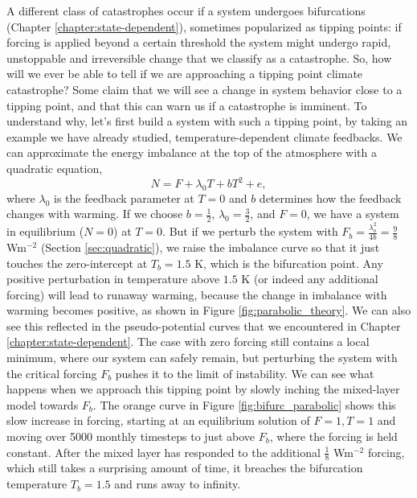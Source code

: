 \documentclass[12pt]{book}
\begin{document}
A different class of catastrophes occur if a system undergoes bifurcations (Chapter \ref{chapter:state-dependent}), sometimes popularized as tipping points: if forcing is applied beyond a certain threshold the system might undergo rapid, unstoppable and irreversible change that we classify as a catastrophe. 
So, how will we ever be able to tell if we are approaching a tipping point climate catastrophe?  Some claim that we will see a change in system behavior close to a tipping point, and that this can warn us if a catastrophe is imminent. To understand why, let's first build a system with such a tipping point, by taking an example we have already studied, temperature-dependent climate feedbacks. We can approximate the energy imbalance at the top of the atmosphere with a quadratic equation,
\begin{equation}
N=F+\lambda_0 T + b T^2 + e, \label{eq:quadratic_catastrophe}
\end{equation}
where $\lambda_0$ is the feedback parameter at $T=0$ and $b$ determines how the feedback changes with warming. If we choose $b=\frac{1}{2}$,  $\lambda_0 = \frac{3}{2}$, and $F=0$, we have a system in equilibrium ($N=0$) at $T=0$. But if we perturb the system with $F_b =\frac{\lambda_o^2}{4b} = \frac{9}{8}$ Wm$^{-2}$ (Section \ref{sec:quadratic}), we raise the imbalance curve so that it just touches the zero-intercept at $T_b=1.5$ K, which is the bifurcation point. Any positive perturbation in temperature above $1.5$ K (or indeed any additional forcing) will lead to runaway warming, because the change in imbalance with warming becomes positive, as shown in Figure \ref{fig:parabolic_theory}. We can also see this reflected in the pseudo-potential curves that we encountered in Chapter \ref{chapter:state-dependent}. The case with zero forcing still contains a local minimum, where our system can safely remain, but perturbing the system with the critical forcing $F_b$ pushes it to the  limit of instability.
We can see what happens when we approach this tipping point by slowly inching the mixed-layer model towards $F_b$. The orange curve in Figure \ref{fig:bifurc_parabolic} shows this slow increase in forcing, starting at an equilibrium solution of $F=1,T=1$ and moving over 5000 monthly timesteps to just above $F_b$, where the forcing is held constant. After the mixed layer has responded to the additional $\frac{1}{8}$ Wm$^{-2}$ forcing, which still takes a surprising amount of time, it breaches the bifurcation temperature $T_b=1.5$ and runs away to infinity.
\\
\end{document}
